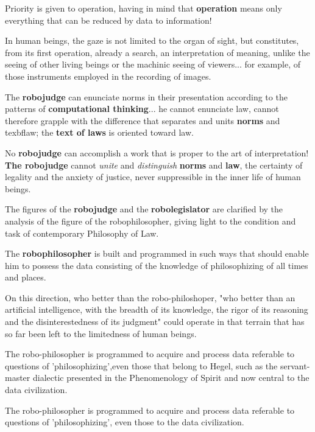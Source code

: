 Priority is given to operation, having in mind that \textbf{operation} means only everything that can be
reduced by data to information!

\begin{example}
    In human beings, the gaze is not limited to the organ of sight, but constitutes, from its first operation,
    already a search, an interpretation of meaning, unlike the seeing of other living beings or the machinic seeing 
    of viewers... for example, of those instruments employed in the recording of images.
\end{example}

The \textbf{robojudge} can enunciate norms in their presentation according to the patterns of \textbf{computational thinking}... he cannot
enunciate law, cannot therefore grapple with the difference that separates and units \textbf{norms} and texbf{law}; the \textbf{text of laws} is 
oriented toward law. 

No \textbf{robojudge} can accomplish a work that is proper to the art of interpretation! \textbf{The robojudge} cannot \textit{unite} and 
\textit{distinguish} \textbf{norms} and \textbf{law}, the certainty of legality and the anxiety of justice,
never suppressible in the inner life of human beings. 


The figures of the \textbf{robojudge} and the \textbf{robolegislator} are clarified by the analysis of the figure 
of the robophilosopher, giving light to the condition and task of contemporary Philosophy of Law.

The \textbf{robophilosopher} is built and programmed in such ways that should enable him to possess the data
consisting of the knowledge of philosophizing of all times and places. 

On this direction, who better than the robo-philoshoper, "who better than an artificial intelligence,
with the breadth of its knowledge, the rigor of its reasoning and the disinterestedness of its judgment"
could operate in that terrain that has so far been left to the limitedness of human beings.

The robo-philosopher is programmed to acquire and process data referable to questions of 'philosophizing',even those
that belong to Hegel, such as the servant-master dialectic presented in the Phenomenology of Spirit and now central
to the data civilization.

The robo-philosopher is programmed to acquire and process data referable to questions of 'philosophizing', even those 
to the data civilization.


